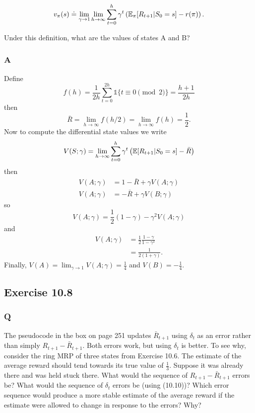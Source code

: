 \[
    v_\pi(s) \doteq \lim_{\gamma \to 1} \lim_{h \to \infty} \sum_{t=0}^h \gamma^t \left( \mathbb{E}_\pi{}[R_{t+1} \vert{} S_0 = s] - r(\pi) \right).
\]

Under this definition, what are the values of states A and B?
\subsubsection{A}
Define
\[
    f(h) = \frac{1}{2h} \sum_{t=0}^{2h} \mathds{1}\{t \equiv 0 \pmod 2\} = \frac{h + 1}{2h}
\]
then
\[
    \bar{R} = \lim_{h \to \infty}f(h/2) = \lim_{h \to \infty}f(h) = \frac12.
\]
Now to compute the differential state values we write
\[
    V(S; \gamma) = \lim_{h\to \infty} \sum_{t=0}^h \gamma^t \left( \mathbb{E}{}[R_{t+1} \vert{} S_0 = s] - \bar{R} \right)
\]
then
\begin{align*}
    V(A; \gamma) &= 1 - \bar{R} + \gamma V(A; \gamma) \\ 
    V(A; \gamma) &= - \bar{R} + \gamma V(B; \gamma)
\end{align*}
so
\[
    V(A; \gamma) = \frac12 ( 1 - \gamma ) - \gamma^2 V(A; \gamma)
\]
and
\begin{align*}
    V(A; \gamma) &= \frac12 \frac{1 - \gamma}{1 - \gamma^2} \\
                 &= \frac{1}{2(1 + \gamma)}.
\end{align*}
Finally, $V(A) = \lim_{\gamma \to 1} V(A; \gamma) = \frac14$ and $V(B) = - \frac14$.
    
\subsection{Exercise 10.8}
\subsubsection{Q}
The pseudocode in the box on page 251 updates $\bar{R}_{t+1}$ using $\delta_t$ as an error rather than simply $R_{t+1} - \bar{R}_{t+1}$. Both errors work, but using $\delta_t$ is better. To see why, consider the ring MRP of three states from Exercise 10.6. The estimate of the average
reward should tend towards its true value of $\frac13$. Suppose it was already there and was held stuck there. What would the sequence of $R_{t+1} - \bar{R}_{t+1}$ errors be? What would the sequence of $\delta_t$ errors be (using (10.10))? Which error sequence would produce a more stable estimate of the average reward if the estimate were allowed to change in response to the errors? Why?
 
